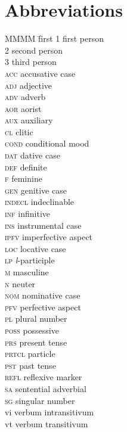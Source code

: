 \documentclass[output=paper]{langscibook}
\begin{document}
\section*{Abbreviations}
\begin{multicols}{2}
\begin{tabbing}
MMMM \= first\kill
\textsc{1} \>  first person\\%
\textsc{2} \>  second person\\%
\textsc{3} \>  third person\\%
\textsc{acc} \>  accusative case\\%
\textsc{adj} \>  adjective\\%
\textsc{adv} \>  adverb\\%
\textsc{aor} \>  aorist\\%
\textsc{aux} \>  auxiliary\\%
\textsc{cl} \>  clitic\\%
\textsc{cond} \>  conditional mood\\%
\textsc{dat} \>  dative case\\%
\textsc{def} \>  definite\\%
\textsc{f} \>  feminine\\%
\textsc{gen} \>  genitive case\\%
\textsc{indecl} \>  indeclinable\\%
\textsc{inf} \>  infinitive\\%
\textsc{ins} \>  instrumental case\\%
\textsc{ipfv} \>  imperfective aspect\\%
\textsc{loc} \>  locative case\\%
\textsc{lp} \>  \textit{l}-participle\\%
\textsc{m} \>  masculine\\%
\textsc{n} \>  neuter\\%
\textsc{nom} \>  nominative case\\%
\textsc{pfv} \>  perfective aspect\\%
\textsc{pl} \>  plural number\\%
\textsc{poss} \>  possessive\\%
\textsc{prs} \>  present tense\\%
\textsc{prtcl} \>  particle\\%
\textsc{pst} \>  past tense\\%
\textsc{refl} \>  reflexive marker\\%
\textsc{sa} \>  sentential adverbial\\
\textsc{sg} \>  singular number\\%
vi  \>  verbum intransitivum\\%
vt  \>  verbum transitivum
\end{tabbing}
\end{multicols}
\end{document}

